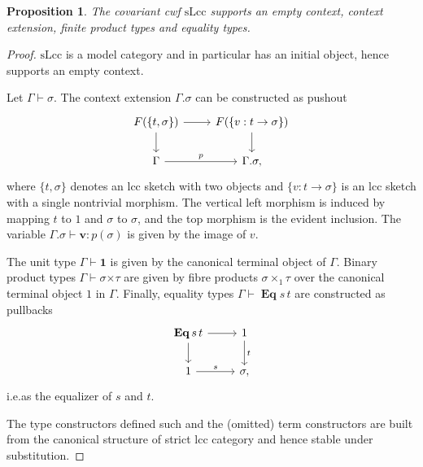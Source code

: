 \documentclass{article}
\newtheorem{proposition}{Proposition}
\begin{document}
\begin{proposition}
  The covariant cwf $\mathrm{sLcc}$ supports an empty context, context extension, finite product types and equality types.
\end{proposition}
\begin{proof}
  $\mathrm{sLcc}$ is a model category and in particular has an initial object, hence supports an empty context.
  
  Let $\Gamma \vdash \sigma$.
  The context extension $\Gamma.\sigma$ can be constructed as pushout
  \begin{equation}
    \begin{tikzcd}
      F(\{ t, \sigma \}) \arrow[d] \arrow[r] & F(\{ v : t \rightarrow \sigma \}) \arrow[d] \\
      \Gamma \arrow[r, "p"] & \Gamma.\sigma,
    \end{tikzcd}
  \end{equation}
  where $\{ t, \sigma \}$ denotes an lcc sketch with two objects and $\{ v : t \rightarrow \sigma \}$ is an lcc sketch with a single nontrivial morphism.
  The vertical left morphism is induced by mapping $t$ to $1$ and $\sigma$ to $\sigma$, and the top morphism is the evident inclusion.
  The variable $\Gamma.\sigma \vdash \mathbf{v} : p(\sigma)$ is given by the image of $v$.

  The unit type $\Gamma \vdash \mathbf{1}$ is given by the canonical terminal object of $\Gamma$.
  Binary product types $\Gamma \vdash \sigma \mathbf{\times} \tau$ are given by fibre products $\sigma \times_1 \tau$ over the canonical terminal object $1$ in $\Gamma$.
  Finally, equality types $\Gamma \vdash \operatorname{\mathbf{Eq}} s \, t$ are constructed as pullbacks
  \begin{equation}
    \label{eq:slcc-context-extension}
    \begin{tikzcd}
      \operatorname{\mathbf{Eq}} s \, t \arrow[r] \arrow[d] & 1 \arrow[d, "t"] \\
      1 \arrow[r, "s"] & \sigma,
    \end{tikzcd}
  \end{equation}
  i.e.\@ as the equalizer of $s$ and $t$.

  The type constructors defined such and the (omitted) term constructors are built from the canonical structure of strict lcc category and hence stable under substitution.
\end{proof}
\end{document}
